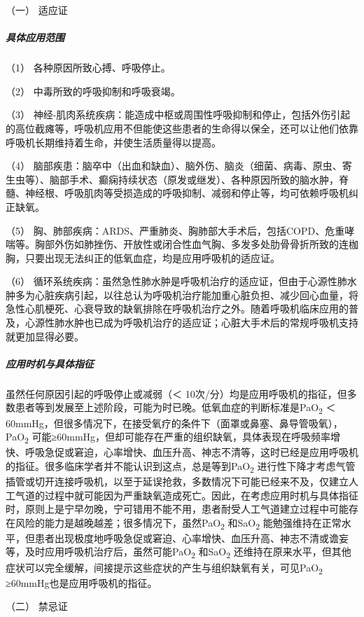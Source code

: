\hypertarget{text00371.htmlux5cux23CHP16-3-5-1-1}{}
（一） 适应证

\subparagraph{具体应用范围}

（1） 各种原因所致心搏、呼吸停止。

（2） 中毒所致的呼吸抑制和呼吸衰竭。

（3）
神经-肌肉系统疾病：能造成中枢或周围性呼吸抑制和停止，包括外伤引起的高位截瘫等，呼吸机应用不但能使这些患者的生命得以保全，还可以让他们依靠呼吸机长期维持着生命，并使生活质量得以提高。

（4）
脑部疾患：脑卒中（出血和缺血）、脑外伤、脑炎（细菌、病毒、原虫、寄生虫等）、脑部手术、癫痫持续状态（原发或继发）、各种原因所致的脑水肿，脊髓、神经根、呼吸肌肉等受损造成的呼吸抑制、减弱和停止等，均可依赖呼吸机纠正缺氧。

（5）
胸、肺部疾病：ARDS、严重肺炎、胸肺部大手术后，包括COPD、危重哮喘等。胸部外伤如肺挫伤、开放性或闭合性血气胸、多发多处肋骨骨折所致的连枷胸，只要出现无法纠正的低氧血症，均是应用呼吸机的适应证。

（6）
循环系统疾病：虽然急性肺水肿是呼吸机治疗的适应证，但由于心源性肺水肿多为心脏疾病引起，以往总认为呼吸机治疗能加重心脏负担、减少回心血量，将急性心肌梗死、心衰导致的缺氧排除在呼吸机治疗之外。随着呼吸机临床应用的普及，心源性肺水肿也已成为呼吸机治疗的适应证；心脏大手术后的常规呼吸机支持就更加显得必要。

\subparagraph{应用时机与具体指征}

虽然任何原因引起的呼吸停止或减弱（＜
10次/分）均是应用呼吸机的指征，但多数患者等到发展至上述阶段，可能为时已晚。低氧血症的判断标准是PaO\textsubscript{2}
＜
60mmHg，但很多情况下，在接受氧疗的条件下（面罩或鼻塞、鼻导管吸氧），PaO\textsubscript{2}
可能≥60mmHg，但却可能存在严重的组织缺氧，具体表现在呼吸频率增快、呼吸急促或窘迫，心率增快、血压升高、神志不清等，这时已经是应用呼吸机的指征。很多临床学者并不能认识到这点，总是等到PaO\textsubscript{2}
进行性下降才考虑气管插管或切开连接呼吸机，以至于延误抢救，多数情况下可能已经来不及，仅建立人工气道的过程中就可能因为严重缺氧造成死亡。因此，在考虑应用时机与具体指征时，原则上是宁早勿晚，宁可错用不能不用，患者耐受人工气道建立过程中可能存在风险的能力是越晚越差；很多情况下，虽然PaO\textsubscript{2}
和SaO\textsubscript{2}
能勉强维持在正常水平，但患者出现极度地呼吸急促或窘迫、心率增快、血压升高、神志不清或谵妄等，及时应用呼吸机治疗后，虽然可能PaO\textsubscript{2}
和SaO\textsubscript{2}
还维持在原来水平，但其他症状可以完全缓解，间接提示这些症状的产生与组织缺氧有关，可见PaO\textsubscript{2}
≥60mmHg也是应用呼吸机的指征。

\hypertarget{text00371.htmlux5cux23CHP16-3-5-1-2}{}
（二） 禁忌证

